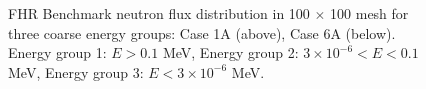 \begin{frame}
\begin{figure}[]
        \vspace{-0.2cm}
        \caption{FHR Benchmark neutron flux 
        distribution in 100 $\times$ 100 mesh for three coarse energy groups: Case 
        1A (above), Case 6A (below). Energy group 1: $E > 0.1$ MeV, 
        Energy group 2: $3 \times 10^{-6} < E < 0.1$ MeV, Energy group 3: $E < 3 \times 10^{-6}$ MeV. }
    \end{figure}
\end{frame}
